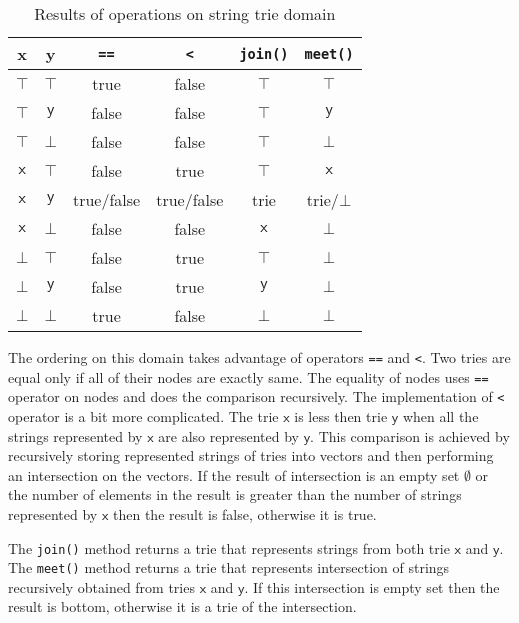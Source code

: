 \documentclass[12pt,final,oneside]{fithesis2}
\theoremstyle{definition}
\begin{document}
\begin{table}[ht]
\centering
\begin{tabular}{c|c|c|c|c|c}
 x & y & \texttt{==} & \texttt{<} & \texttt{join()} & \texttt{meet()} \\
\hline
$\top$       & $\top$       & true       & false      & $\top$       & $\top$ \\
$\top$       & $\mathsf{y}$ & false      & false      & $\top$       & $\mathsf{y}$ \\
$\top$       & $\bot$       & false      & false      & $\top$       & $\bot$ \\
$\mathsf{x}$ & $\top$       & false      & true       & $\top$       & $\mathsf{x}$ \\
$\mathsf{x}$ & $\mathsf{y}$ & true/false & true/false & trie         & trie/$\bot$ \\
$\mathsf{x}$ & $\bot$       & false      & false      & $\mathsf{x}$ & $\bot$ \\
$\bot$       & $\top$       & false      & true       & $\top$       & $\bot$ \\
$\bot$       & $\mathsf{y}$ & false      & true       & $\mathsf{y}$ & $\bot$ \\
$\bot$       & $\bot$       & true       & false      & $\bot$       & $\bot$
\end{tabular}
\caption{Results of operations on string trie domain}
\label{tab:trieops}
\end{table}

The ordering on this domain takes advantage of operators \texttt{==} and
\texttt{<}. Two tries are equal only if all of their nodes are exactly same.
The equality of nodes uses \texttt{==} operator on nodes and does the comparison
recursively. The implementation of \texttt{<} operator is a bit more
complicated. The trie $\mathsf{x}$ is less then trie $\mathsf{y}$ when all the
strings represented by $\mathsf{x}$ are also represented by $\mathsf{y}$.
This comparison is achieved by recursively storing represented strings of
tries into vectors and then performing an intersection on the vectors.
If the result of intersection is an empty set
$\emptyset$ or the number of elements in the result is greater than the number
of strings represented by $\mathsf{x}$ then the result is false, otherwise
it is true.

The \texttt{join()} method returns a trie that represents strings from
both trie $\mathsf{x}$ and $\mathsf{y}$. The \texttt{meet()} method returns a trie that
represents intersection of strings recursively obtained from tries $\mathsf{x}$
and $\mathsf{y}$. If this intersection is empty set then the result is bottom,
otherwise it is a trie of the intersection.
\end{document}
